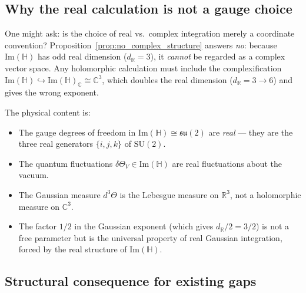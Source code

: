 \documentclass[11pt,a4paper]{article}
\theoremstyle{definition}
\theoremstyle{remark}
\begin{document}
\subsection{Why the real calculation is not a gauge choice}

One might ask: is the choice of real vs.\ complex integration merely a
coordinate convention? Proposition~\ref{prop:no_complex_structure} answers
\emph{no}: because $\mathrm{Im}(\mathbb{H})$ has odd real dimension ($d_\mathbb{R} = 3$),
it \emph{cannot} be regarded as a complex vector space.
Any holomorphic calculation must include the complexification
$\mathrm{Im}(\mathbb{H}) \hookrightarrow \mathrm{Im}(\mathbb{H})_\mathbb{C} \cong \mathbb{C}^3$,
which doubles the real dimension ($d_\mathbb{R} = 3 \to 6$) and gives the wrong
exponent.

The physical content is:
\begin{itemize}
  \item The gauge degrees of freedom in $\mathrm{Im}(\mathbb{H}) \cong \mathfrak{su}(2)$
    are \emph{real} — they are the three real generators $\{i, j, k\}$ of $\mathrm{SU}(2)$.
  \item The quantum fluctuations $\delta\Theta_V \in \mathrm{Im}(\mathbb{H})$ are
    real fluctuations about the vacuum.
  \item The Gaussian measure $d^3\Theta$ is the Lebesgue measure on $\mathbb{R}^3$,
    not a holomorphic measure on $\mathbb{C}^3$.
  \item The factor $1/2$ in the Gaussian exponent (which gives $d_\mathbb{R}/2 = 3/2$)
    is not a free parameter but is the universal property of real Gaussian integration,
    forced by the real structure of $\mathrm{Im}(\mathbb{H})$.
\end{itemize}

\subsection{Structural consequence for existing gaps}
\end{document}
